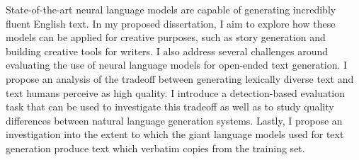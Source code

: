 \begin{center}
\mytitle
{\Large{}}
\end{center}
\vspace{1cm}
State-of-the-art neural language models are capable of generating incredibly fluent English text.
In my proposed dissertation, I aim to explore how these models can be applied for creative purposes, such as story generation and building creative tools for writers.
I also address several challenges around evaluating the use of neural language models for open-ended text generation.
I propose an analysis of the tradeoff between generating lexically diverse text and text humans perceive as high quality.
I introduce a detection-based evaluation task that can be used to investigate this tradeoff as well as to study quality differences between natural language generation systems.
Lastly, I propose an investigation into the extent to which the giant language models used for text generation produce text which verbatim copies from the training set.
